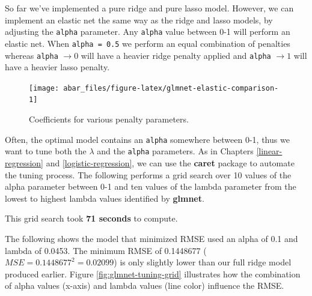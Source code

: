 \documentclass[]{book}
\theoremstyle{definition}
\theoremstyle{definition}
\theoremstyle{definition}
\theoremstyle{remark}
\begin{document}
So far we've implemented a pure ridge and pure lasso model. However, we
can implement an elastic net the same way as the ridge and lasso models,
by adjusting the \texttt{alpha} parameter. Any \texttt{alpha} value
between 0-1 will perform an elastic net. When \texttt{alpha\ =\ 0.5} we
perform an equal combination of penalties whereas \texttt{alpha}
\(\rightarrow 0\) will have a heavier ridge penalty applied and
\texttt{alpha} \(\rightarrow 1\) will have a heavier lasso penalty.

\begin{figure}

{\centering \texttt{[image: abar\_files/figure-latex/glmnet-elastic-comparison-1]} 

}

\caption{Coefficients for various penalty parameters.}\label{fig:glmnet-elastic-comparison}
\end{figure}

Often, the optimal model contains an \texttt{alpha} somewhere between
0-1, thus we want to tune both the \(\lambda\) and the \texttt{alpha}
parameters. As in Chapters \ref{linear-regression} and
\ref{logistic-regression}, we can use the \textbf{caret} package to
automate the tuning process. The following performs a grid search over
10 values of the alpha parameter between 0-1 and ten values of the
lambda parameter from the lowest to highest lambda values identified by
\textbf{glmnet}.

\begin{warning}
This grid search took \textbf{71 seconds} to compute.
\end{warning}

The following shows the model that minimized RMSE used an alpha of 0.1
and lambda of 0.0453. The minimum RMSE of 0.1448677
(\(MSE = 0.1448677^2 = 0.02099\)) is only slightly lower than our full
ridge model produced earlier. Figure \ref{fig:glmnet-tuning-grid}
illustrates how the combination of alpha values (x-axis) and lambda
values (line color) influence the RMSE.
\end{document}
